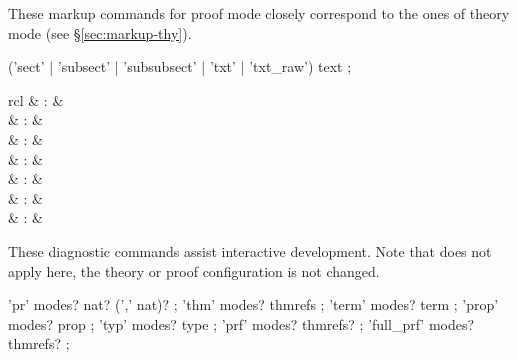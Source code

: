 \begin{isabellebody}
\begin{isamarkuptext}
  These markup commands for proof mode closely correspond to the ones
  of theory mode (see \S\ref{sec:markup-thy}).

  \begin{rail}
    ('sect' | 'subsect' | 'subsubsect' | 'txt' | 'txt\_raw') text
    ;
  \end{rail}%
\end{isamarkuptext}%
\isamarkuptrue%
%
\isamarkuptrue%
%
\isamarkuptrue%
%
\begin{isamarkuptext}%
\begin{matharray}{rcl}
    \mbox{}\isa{{\isachardoublequote}\isactrlsup {\isacharasterisk}{\isachardoublequote}} & : & \isarkeep{\cdot} \\
    \mbox{}\isa{{\isachardoublequote}\isactrlsup {\isacharasterisk}{\isachardoublequote}} & : &  \\
    \mbox{}\isa{{\isachardoublequote}\isactrlsup {\isacharasterisk}{\isachardoublequote}} & : &  \\
    \mbox{}\isa{{\isachardoublequote}\isactrlsup {\isacharasterisk}{\isachardoublequote}} & : &  \\
    \mbox{}\isa{{\isachardoublequote}\isactrlsup {\isacharasterisk}{\isachardoublequote}} & : &  \\
    \mbox{}\isa{{\isachardoublequote}\isactrlsup {\isacharasterisk}{\isachardoublequote}} & : &  \\
    \mbox{}\isa{{\isachardoublequote}\isactrlsup {\isacharasterisk}{\isachardoublequote}} & : &  \\
  \end{matharray}

  These diagnostic commands assist interactive development.  Note that
  \mbox{} does not apply here, the theory or proof
  configuration is not changed.

  \begin{rail}
    'pr' modes? nat? (',' nat)?
    ;
    'thm' modes? thmrefs
    ;
    'term' modes? term
    ;
    'prop' modes? prop
    ;
    'typ' modes? type
    ;
    'prf' modes? thmrefs?
    ;
    'full\_prf' modes? thmrefs?
    ;


\end{rail}
\end{isamarkuptext}
\end{isabellebody}
